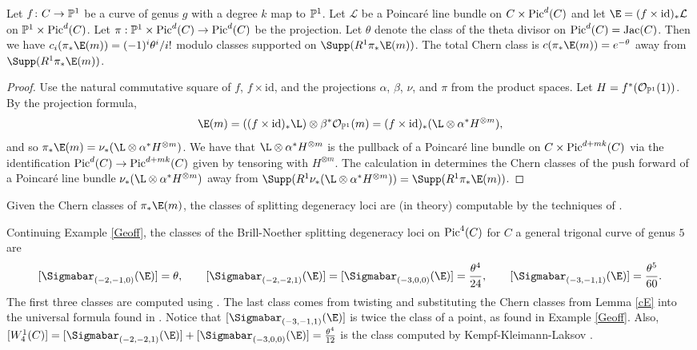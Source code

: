 \begin{Lemma}
\notready \label{cE}
Let $f\colon  C \rightarrow \mathbb{P}^1$ be a curve of genus $g$ with a degree $k$ map to $\mathbb{P}^1$.
Let $\mathcal{L}$ be a Poincar\'e line bundle on $C \times \operatorname{Pic}^d(C)$ and let $\E = (f \times \mathrm{id})_* \mathcal{L}$ on $\mathbb{P}^1 \times \operatorname{Pic}^d(C)$. Let $\pi: \mathbb{P}^1 \times \operatorname{Pic}^d(C) \rightarrow \operatorname{Pic}^d(C)$ be the projection.
Let $\theta$ denote the class of the theta divisor on $\operatorname{Pic}^d(C) = \operatorname{Jac}(C)$.
Then we have $c_i(\pi_*\E(m)) = (-1)^i\theta^i/i!$ modulo classes supported on $\Supp(R^1\pi_*\E(m))$. The total Chern class is $c(\pi_*\E(m)) = e^{-\theta}$ away from $\Supp(R^1\pi_*\E(m))$.
\end{Lemma}
\begin{proof}
Use the natural commutative square of $f$, $f\times\mathrm{id}$, and the
projections $\alpha$, $\beta$, $\nu$, and $\pi$ from the product spaces.
Let $H = f^*(\mathcal{O}_{\mathbb{P}^1}(1))$.
By the projection formula,
\[\E(m) = ((f\times \mathrm{id})_* \L) \otimes \beta^* \O_{\pp^1}(m) =(f \times \mathrm{id})_*(\L \otimes \alpha^* H^{\otimes m}),\]
and so $\pi_*\E(m) = \nu_*(\L \otimes \alpha^* H^{\otimes m})$. We have that $\L \otimes \alpha^*H^{\otimes m}$ is the pullback of a Poincar\'e line bundle on $C \times \operatorname{Pic}^{d+mk}(C)$ via the identification $\operatorname{Pic}^d(C) \rightarrow \operatorname{Pic}^{d+mk}(C)$ given by tensoring with $H^{\otimes m}$. The calculation in \cite[p. 336]{ACGH} determines the Chern classes of the push forward of a Poincar\'e line bundle $\nu_*(\L \otimes \alpha^*H^{\otimes m})$ away from $\Supp(R^1\nu_*(\L \otimes \alpha^*H^{\otimes m})) = \Supp(R^1 \pi_*\E(m))$.
\end{proof}

Given the Chern classes of $\pi_*\E(m)$, the classes of splitting degeneracy loci are (in theory) computable by the techniques of \cite{L}.
\begin{Example} \label{revisit}
Continuing Example \ref{Geoff}, the classes of the Brill-Noether splitting degeneracy loci on $\operatorname{Pic}^4(C)$ for $C$ a general trigonal curve of genus $5$ are
\[[\Sigmabar_{(-2, -1, 0)}(\E)] = \theta, \qquad [\Sigmabar_{(-2, -2, 1)}(\E)] = [\Sigmabar_{(-3, 0, 0)}(\E)] = \frac{\theta^4}{24}, \qquad [\Sigmabar_{(-3, -1, 1)}(\E)] = \frac{\theta^5}{60}.\]
The first three classes are computed using \cite[Lemma 5.1]{L}. The last class comes from twisting and substituting the Chern classes from Lemma \ref{cE} into the universal formula found in \cite[Example 6.2]{L}. Notice that $[\Sigmabar_{(-3, -1, 1)}(\E)]$ is twice the class of a point, as found in Example \ref{Geoff}.
Also, $[W^1_4(C)] = [\Sigmabar_{(-2, -2, 1)}(\E)] + [\Sigmabar_{(-3, 0, 0)}(\E)] = \frac{\theta^4}{12}$ is the class computed by Kempf-Kleimann-Laksov \cite{K,KL1,KL2}.
\end{Example}

